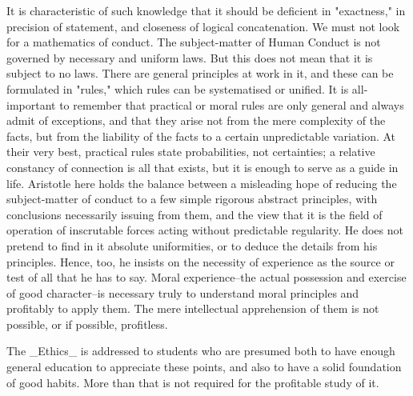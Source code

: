 It is characteristic of such knowledge that it should be deficient
in "exactness," in precision of statement, and closeness of logical
concatenation. We must not look for a mathematics of conduct. The
subject-matter of Human Conduct is not governed by necessary and uniform
laws. But this does not mean that it is subject to no laws. There
are general principles at work in it, and these can be formulated in
"rules," which rules can be systematised or unified. It is all-important
to remember that practical or moral rules are only general and always
admit of exceptions, and that they arise not from the mere complexity
of the facts, but from the liability of the facts to a certain
unpredictable variation. At their very best, practical rules state
probabilities, not certainties; a relative constancy of connection is
all that exists, but it is enough to serve as a guide in life. Aristotle
here holds the balance between a misleading hope of reducing the
subject-matter of conduct to a few simple rigorous abstract principles,
with conclusions necessarily issuing from them, and the view that it is
the field of operation of inscrutable forces acting without predictable
regularity. He does not pretend to find in it absolute uniformities, or
to deduce the details from his principles. Hence, too, he insists on the
necessity of experience as the source or test of all that he has to
say. Moral experience--the actual possession and exercise of good
character--is necessary truly to understand moral principles and
profitably to apply them. The mere intellectual apprehension of them is
not possible, or if possible, profitless.

The _Ethics_ is addressed to students who are presumed both to have
enough general education to appreciate these points, and also to have a
solid foundation of good habits. More than that is not required for the
profitable study of it.

